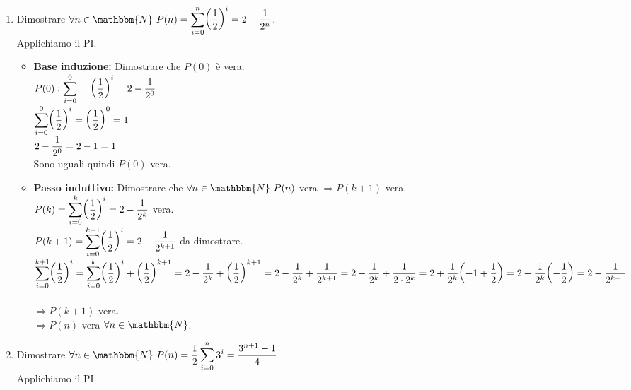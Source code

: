 \documentclass[12pt, letterpaper]{report}
\begin{document}
  		\begin{enumerate}
  			\item Dimostrare $\forall n \in \mathbbm{N} \ P(n) = \mathlarger{\sum_{i = 0}^{n}\biggl(\frac{1}{2}\biggl)^i} = 2 - \mathlarger{\frac{1}{2^n}}$. \\
  			Applichiamo il PI.
  			\begin{itemize}
  				\item \textbf{Base induzione:} Dimostrare che $P(0)$ è vera. \\
  				$P(0): \mathlarger{\sum_{i=0}^{0} = \biggl(\frac{1}{2}\biggl)^i} = 2 - \mathlarger{\frac{1}{2^0}}$ \\
  				$\mathlarger{\sum_{i=0}^{0}\biggl(\frac{1}{2}\biggl)^i} = \mathlarger{\biggl(\frac{1}{2}\biggl)^0} = 1$ \\
  				$2 - \mathlarger{\frac{1}{2^0}} = 2 - 1 = 1$ \\
  				Sono uguali quindi $P(0)$ vera.
  				\item \textbf{Passo induttivo:} Dimostrare che $\forall n \in \mathbbm{N} \ P(n)$ vera $\Rightarrow P(k + 1)$ vera. \\
  				$P(k) = \mathlarger{\sum_{i=0}^{k}\biggl(\frac{1}{2}\biggl)^i} = 2 - \mathlarger{\frac{1}{2^k}}$ vera.\\
  				$P(k+1) = \mathlarger{\sum_{i=0}^{k+1}\biggl(\frac{1}{2}\biggl)^i} = 2 - \mathlarger{\frac{1}{2^{k+1}}}$ da dimostrare.\\
  				$\mathlarger{\sum_{i=0}^{k+1}\biggl(\frac{1}{2}\biggl)^i} = \mathlarger{\sum_{i=0}^{k}\biggl(\frac{1}{2}\biggl)^i} + \mathlarger{\biggl(\frac{1}{2}\biggl)^{k + 1}} = 2 - \mathlarger{\frac{1}{2^k}} + \mathlarger{\biggl(\frac{1}{2}\biggl)^{k + 1}} = 2 - \mathlarger{\frac{1}{2^k}} + \mathlarger{\frac{1}{2^{k + 1}}} = 2 - \mathlarger{\frac{1}{2^k}} + \mathlarger{\frac{1}{2 \cdot 2^k}} = 2 + \mathlarger{\frac{1}{2^k}\biggl(-1 + \frac{1}{2}\biggl)} = 2 + \mathlarger{\frac{1}{2^k}\biggl(-\frac{1}{2}\biggl)} = 2 - \mathlarger{\frac{1}{2^{k+1}}}$. \\
  				$\Rightarrow P(k + 1)$ vera. \\
  				$\Rightarrow P(n)$ vera $\forall n \in \mathbbm{N}$. \\
  			\end{itemize}
  			\item  Dimostrare $\forall n \in \mathbbm{N} \ P(n) = \mathlarger{\frac{1}{2}\sum_{i = 0}^{n}3^i = \frac{3^{n + 1} - 1}{4}}$. \\
  			Applichiamo il PI.
  			\begin{itemize}

\end{itemize}
\end{enumerate}
\end{document}
